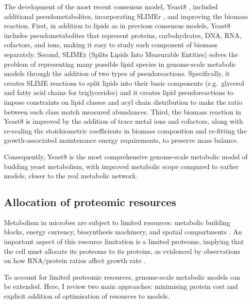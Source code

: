 The development of the most recent consensus model, Yeast8 \parencite{luConsensusCerevisiaeMetabolic2019}, included additional pseudometabolites, incorporating SLIMEr \parencite{sanchezSLIMErProbingFlexibility2019}, and improving the biomass reaction.
First, in addition to lipids as in previous consensus models, Yeast8 includes pseudometabolites that represent proteins, carbohydrates, DNA, RNA, cofactors, and ions, making it easy to study each component of biomass separately.
Second, SLIMEr (Splits Lipids Into Measurable Entities) solves the problem of representing many possible lipid species in genome-scale metabolic models through the addition of two types of pseudoreactions.
Specifically, it creates SLIME reactions to split lipids into their basic components (e.g.\ glycerol and fatty acid chains for triglycerides) and it creates lipid pseudoreactions to impose constraints on lipid classes and acyl chain distribution to make the ratio between each class match measured abundances.
Third, the biomass reaction in Yeast8 is improved by the addition of trace metal ions and cofactors, along with re-scaling the stoichiometric coefficients in biomass composition and re-fitting the growth-associated maintenance energy requirements, to preserve mass balance.

Consequently, Yeast8 is the most comprehensive genome-scale metabolic model of budding yeast metabolism, with improved metabolic scope compared to earlier models, closer to the real metabolic network.


\subsection{Allocation of proteomic resources}
\label{subsec:intro-fba-ec}

Metabolism in microbes are subject to limited resources: metabolic building blocks, energy currency, biosynthesis machinery, and spatial compartments \parencite{elsemmanWholecellModelingYeast2022}.
An important aspect of this resource limitation is a limited proteome, implying that the cell must allocate its proteome to its proteins, as evidenced by observations on how RNA/protein ratios affect growth rate \parencite{scottBacterialGrowthLaws2011}.

To account for limited proteomic resources, genome-scale metabolic models can be extended.
Here, I review two main approaches: minimising protein cost and explicit addition of optimisation of resources to models.

